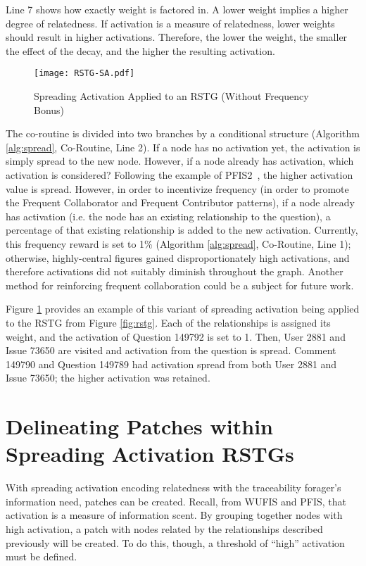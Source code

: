 Line 7 shows how exactly weight is factored in. A lower weight implies a higher degree of relatedness. If activation is a measure of relatedness, lower weights should result in higher activations. Therefore, the lower the weight, the smaller the effect of the decay, and the higher the resulting activation.

\begin{figure}[ht]
	\centering
	\texttt{[image: RSTG-SA.pdf]}
	\caption{Spreading Activation Applied to an RSTG (Without Frequency Bonus)}
	\label{fig:rstg-sa}
\end{figure}

The co-routine is divided into two branches by a conditional structure (Algorithm \ref{alg:spread}, Co-Routine, Line 2). If a node has no activation yet, the activation is simply spread to the new node. However, if a node already has activation, which activation is considered? Following the example of PFIS2~\cite{pfis2}, the higher activation value is spread. However, in order to incentivize frequency (in order to promote the Frequent Collaborator and Frequent Contributor patterns), if a node already has activation (i.e. the node has an existing relationship to the question), a percentage of that existing relationship is added to the new activation. Currently, this frequency reward is set to 1\% (Algorithm \ref{alg:spread}, Co-Routine, Line 1); otherwise, highly-central figures gained disproportionately high activations, and therefore activations did not suitably diminish throughout the graph. Another method for reinforcing frequent collaboration could be a subject for future work.

Figure \ref{fig:rstg-sa} provides an example of this variant of spreading activation being applied to the RSTG from Figure \ref{fig:rstg}. Each of the relationships is assigned its weight, and the activation of Question 149792 is set to 1. Then, User 2881 and Issue 73650 are visited and activation from the question is spread. Comment 149790 and Question 149789 had activation spread from both User 2881 and Issue 73650; the higher activation was retained. 

\section{Delineating Patches within Spreading Activation RSTGs}
With spreading activation encoding relatedness with the traceability forager's information need, patches can be created. Recall, from WUFIS and PFIS, that activation is a measure of information scent. By grouping together nodes with high activation, a patch with nodes related by the relationships described previously will be created. To do this, though, a threshold of ``high'' activation must be defined.

